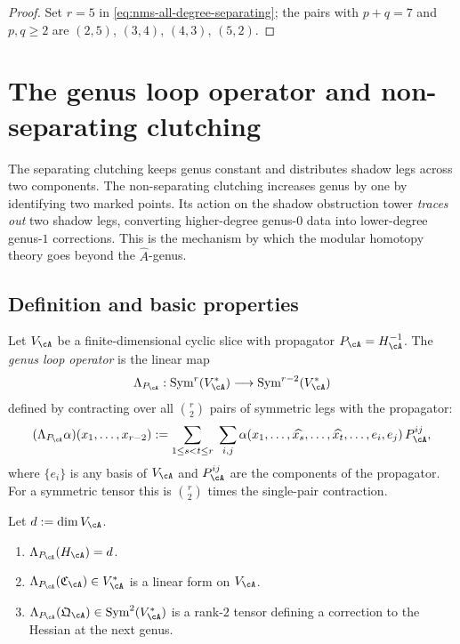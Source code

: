 \begin{proof}
Set $r=5$ in \eqref{eq:nms-all-degree-separating}; the pairs with $p+q=7$ and $p,q\ge 2$ are $(2,5)$, $(3,4)$, $(4,3)$, $(5,2)$.\qedhere
\end{proof}

\section{The genus loop operator and non-separating clutching}
\label{sec:nms-genus-loop-operator}

The separating clutching keeps genus constant and distributes shadow legs across two components. The non-separating clutching increases genus by one by identifying two marked points. Its action on the shadow obstruction tower \emph{traces out} two shadow legs, converting higher-degree genus-$0$ data into lower-degree genus-$1$ corrections. This is the mechanism by which the modular homotopy theory goes beyond the $\hat{A}$-genus.

\subsection{Definition and basic properties}
\label{subsec:nms-genus-loop-definition}

\begin{definition}
\label{def:nms-genus-loop-operator}
Let $V_{\cA}$ be a finite-dimensional cyclic slice with propagator $P_{\cA}=H_{\cA}^{-1}$. The \emph{genus loop operator} is the linear map
\begin{equation}
\label{eq:nms-genus-loop-operator}
\Lambda_{P_{\cA}}:\operatorname{Sym}^r(V_{\cA}^*)\longrightarrow \operatorname{Sym}^{r-2}(V_{\cA}^*)
\end{equation}
defined by contracting over all $\binom{r}{2}$ pairs of symmetric legs with the propagator:
\begin{equation}
\label{eq:nms-genus-loop-formula}
(\Lambda_{P_{\cA}}\alpha)(x_1,\dots,x_{r-2})
:=
\sum_{1\le s<t\le r}\;\sum_{i,j}
\alpha(x_1,\dots,\widehat{x_s},\dots,\widehat{x_t},\dots,e_i,e_j)\,P_{\cA}^{ij},
\end{equation}
where $\{e_i\}$ is any basis of $V_{\cA}$ and $P_{\cA}^{ij}$ are the components of the propagator. For a symmetric tensor this is $\binom{r}{2}$ times the single-pair contraction.
\end{definition}

\begin{proposition}
\label{prop:nms-genus-loop-properties}
Let $d:=\dim V_{\cA}$.
\begin{enumerate}[label=\textup{(\roman*)}]
\item $\Lambda_{P_{\cA}}(H_{\cA})=d$.
\item $\Lambda_{P_{\cA}}(\mathfrak C_{\cA})\in V_{\cA}^*$ is a linear form on $V_{\cA}$.
\item $\Lambda_{P_{\cA}}(\mathfrak Q_{\cA})\in \operatorname{Sym}^2(V_{\cA}^*)$ is a rank-$2$ tensor defining a correction to the Hessian at the next genus.
\end{enumerate}
\end{proposition}

